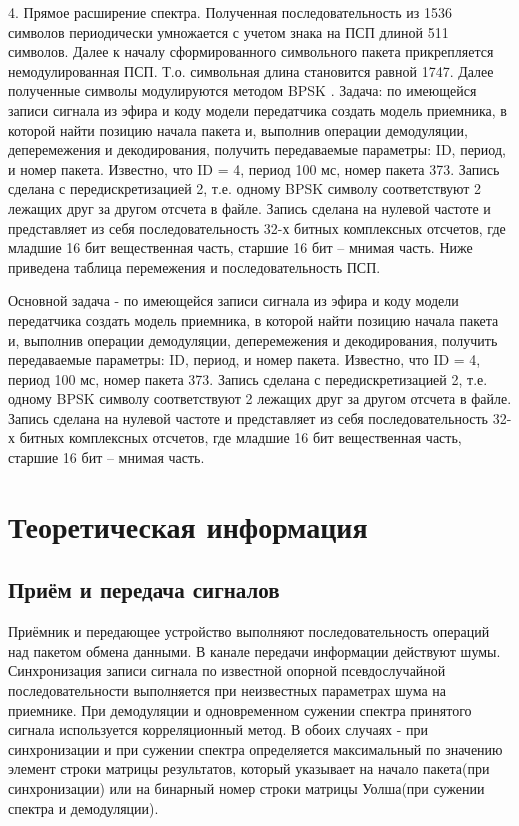 \documentclass[a4paper,14pt]{extarticle}
\begin{document}
4. Прямое расширение спектра. Полученная последовательность из 1536 символов периодически умножается с учетом знака на ПСП длиной 511 символов. Далее к началу сформированного символьного пакета прикрепляется немодулированная ПСП. Т.о. символьная длина становится равной 1747. Далее полученные символы модулируются методом BPSK . Задача: по имеющейся записи сигнала из эфира и коду модели передатчика создать модель приемника, в которой найти позицию начала пакета и, выполнив операции демодуляции, деперемежения и декодирования, получить передаваемые параметры: ID, период, и номер пакета. Известно, что ID = 4, период 100 мс, номер пакета 373. Запись сделана с передискретизацией 2, т.е. одному BPSK символу соответствуют 2 лежащих друг за другом отсчета в файле. Запись сделана на нулевой частоте и представляет из себя последовательность 32-х битных комплексных отсчетов, где младшие 16 бит вещественная часть, старшие 16 бит – мнимая часть. Ниже приведена таблица перемежения и последовательность ПСП.

Основной задача - по имеющейся записи сигнала из эфира и коду модели передатчика создать модель приемника, в которой найти позицию начала пакета и, выполнив операции демодуляции, деперемежения и декодирования, получить передаваемые параметры: ID, период, и номер пакета.
Известно, что ID = 4, период 100 мс, номер пакета 373. Запись сделана с передискретизацией 2, т.е. одному BPSK символу соответствуют 2 лежащих друг за другом отсчета в файле. Запись сделана на нулевой частоте и представляет из себя последовательность 32-х битных комплексных отсчетов, где младшие 16 бит вещественная часть, старшие 16 бит – мнимая часть. 

\section{Теоретическая информация}
\subsection{Приём и передача сигналов}

Приёмник и передающее устройство выполняют последовательность операций над пакетом обмена данными. В канале передачи информации действуют шумы. Синхронизация записи сигнала по известной опорной псевдослучайной последовательности выполняется при неизвестных параметрах шума на приемнике. При демодуляции и одновременном сужении спектра принятого сигнала используется корреляционный метод. В обоих случаях - при синхронизации и при сужении спектра определяется максимальный по значению элемент строки матрицы результатов, который указывает на начало пакета(при синхронизации) или на бинарный номер строки матрицы Уолша(при сужении спектра и демодуляции).
\end{document}
